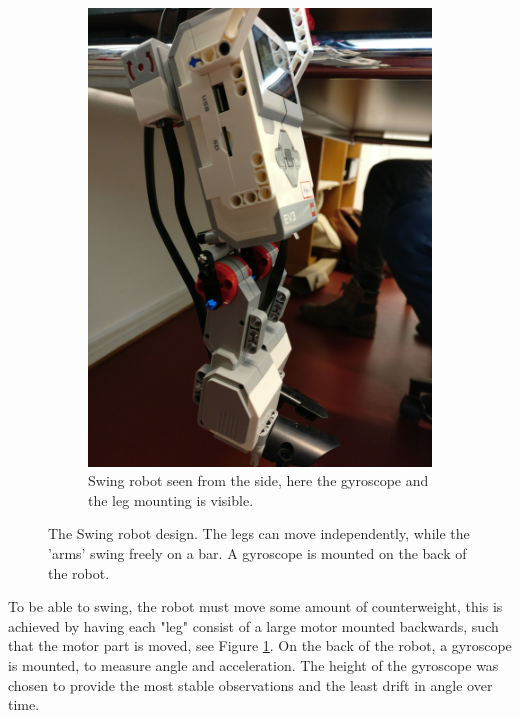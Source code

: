 \documentclass[11pt, a4paper]{article}
\begin{document}
\begin{figure}[H]
\begin{subfigure}{.48\textwidth}
	\end{subfigure}
	\begin{subfigure}{.48\textwidth}
		\centering
		\includegraphics[width=1\linewidth]{images/swing_robot_side}
		\caption{Swing robot seen from the side, here the gyroscope and the leg mounting is visible.}
		\label{fig:swing_robot_side}
	\end{subfigure}%
	\caption{The Swing robot design. The legs can move independently, while the 'arms' swing freely on a bar. A gyroscope is mounted on the back of the robot.}
	\label{fig:swing_robot}
\end{figure}

To be able to swing, the robot must move some amount of counterweight, this is achieved by having each "leg" consist of a large motor mounted backwards, such that the motor part is moved, see Figure \ref{fig:swing_robot_side}.
On the back of the robot, a gyroscope is mounted, to measure angle and acceleration. The height of the gyroscope was chosen to provide the most stable observations and the least drift in angle over time.
\end{document}
